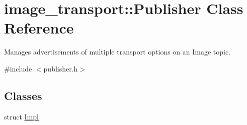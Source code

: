 \hypertarget{classimage__transport_1_1_publisher}{\section{image\-\_\-transport\-:\-:Publisher Class Reference}
\label{classimage__transport_1_1_publisher}
}


Manages advertisements of multiple transport options on an Image topic.  




{\ttfamily \#include $<$publisher.\-h$>$}

\subsection*{Classes}
\begin{DoxyCompactItemize}
\item 
struct \hyperlink{structimage__transport_1_1_publisher_1_1_impl}{Impl}
\end{DoxyCompactItemize}
